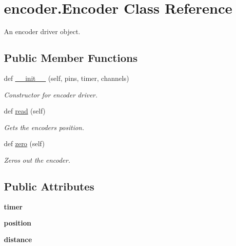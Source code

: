 \hypertarget{classencoder_1_1_encoder}{}\section{encoder.\+Encoder Class Reference}
\label{classencoder_1_1_encoder}


An encoder driver object.  


\subsection*{Public Member Functions}
\begin{DoxyCompactItemize}
\item 
def \mbox{\hyperlink{classencoder_1_1_encoder_a34939827412badc93f8744540676e833}{\+\_\+\+\_\+init\+\_\+\+\_\+}} (self, pins, timer, channels)
\begin{DoxyCompactList}\small\item\em Constructor for encoder driver. \end{DoxyCompactList}\item 
def \mbox{\hyperlink{classencoder_1_1_encoder_aa1c1535160682500f5214f45d8197027}{read}} (self)
\begin{DoxyCompactList}\small\item\em Gets the encoder\textquotesingle{}s position. \end{DoxyCompactList}\item 
def \mbox{\hyperlink{classencoder_1_1_encoder_ae238ecdbcbce8a193c2e0ffbb4d1dd29}{zero}} (self)
\begin{DoxyCompactList}\small\item\em Zeros out the encoder. \end{DoxyCompactList}\end{DoxyCompactItemize}
\subsection*{Public Attributes}
\begin{DoxyCompactItemize}
\item 
\mbox{\label{classencoder_1_1_encoder_a8e9c3e1317abc4f6fbe95468c69223d1}} 
{\bfseries timer}
\item 
\mbox{\label{classencoder_1_1_encoder_a9c15eb087b5869c188cf94e53ea3b4f5}} 
{\bfseries position}
\item 
\mbox{\label{classencoder_1_1_encoder_ac16be7b70ef28d19b75108d422f82e28}} 
{\bfseries distance}
\end{DoxyCompactItemize}


